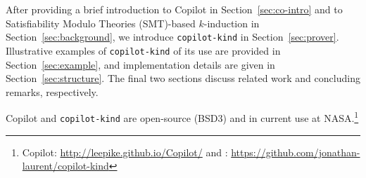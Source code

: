 After providing a brief introduction to Copilot in Section~\ref{sec:co-intro}
and to Satisfiability Modulo Theories (SMT)-based $k$-induction in Section~\ref{sec:background}, we introduce
\texttt{copilot-kind} in Section~\ref{sec:prover}. Illustrative examples of
\texttt{copilot-kind} of its use are provided in Section~\ref{sec:example}, and
implementation details are given in Section~\ref{sec:structure}. The final two
sections discuss related work and concluding remarks, respectively.

Copilot and \texttt{copilot-kind} are open-source (BSD3) and in current use at
NASA.\footnote{Copilot: \url{http://leepike.github.io/Copilot/} and
: \url{https://github.com/jonathan-laurent/copilot-kind}}








  







